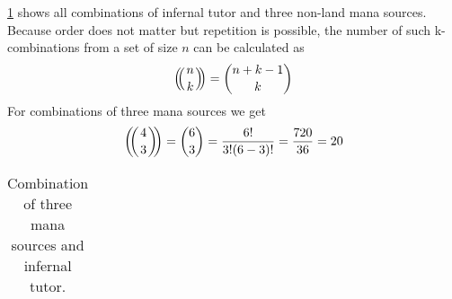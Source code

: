 \documentclass{article}
\def\multiset#1#2{\ensuremath{\left(\kern-.3em\left(\genfrac{}{}{0pt}{}{#1}{#2}\right)\kern-.3em\right)}}
\begin{document}
\cref{tab:it3} shows all combinations of infernal tutor and three non-land mana sources.
Because order does not matter but repetition is possible, the number of such k-combinations from a set of size $n$
can be calculated as
\[ \multiset{n}{k} = { n + k -1 \choose k } \]
For combinations of three mana sources we get
\[ \multiset{4}{3} = { 6 \choose 3 } = \frac{6!}{3! (6-3)! } = \frac{720}{36} = 20 \]




\begin{table}
\begin{tabular}{lll}
\end{tabular}
\caption{Combination of three mana sources and infernal tutor. }
\label{tab:it3}
\end{table}
\end{document}
